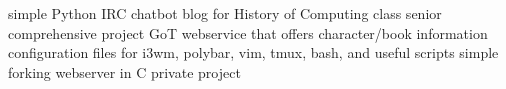 \begin{cvskills}
  {simple Python IRC chatbot
    \hfill {} \hskip 0.4in}
  {blog for History of Computing class
    \hfill {} \hskip 0.4in}
  {senior comprehensive project
    \hfill {} \hskip 0.4in}
  {GoT webservice that offers character/book information
    \hfill {} \hskip 0.4in}
  {configuration files for i3wm, polybar, vim, tmux, bash, and useful scripts
  \hfill {} \hskip 0.4in}
  {simple forking webserver in C \hfill private project \hskip 0.4in}
\end{cvskills}
